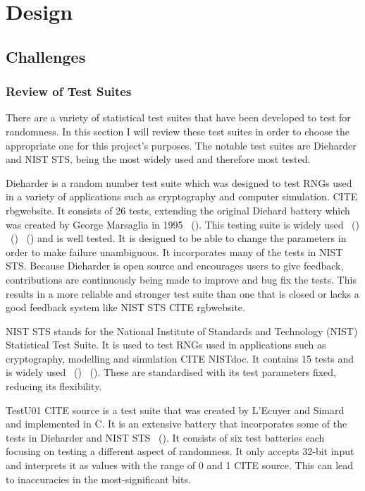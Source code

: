 \chapter{Design}

\section{Challenges}
\subsection{Review of Test Suites}
There are a variety of statistical test suites that have been developed to test for randomness. In this section I will review these test suites in order to choose the appropriate one for this project's purposes. The notable test suites are Dieharder and NIST STS, being the most widely used and therefore most tested. \newline

Dieharder is a random number test suite which was designed to test RNGs used in a variety of applications such as cryptography and computer simulation. CITE rbgwebsite. It consists of 26 tests, extending the original Diehard battery which was created by George Marsaglia in 1995 ~(\cite{10.1145/3447773}). This testing suite is widely used ~(\cite{10.1145/3527157}) ~(\cite{10.1145/3398726}) ~(\cite{10.1145/3624991}) and is well tested. It is designed to be able to change the parameters in order to make failure unambiguous. It incorporates many of the tests in NIST STS. Because Dieharder is open source and encourages users to give feedback, contributions are continuously being made to improve and bug fix the tests. This results in a more reliable and stronger test suite than one that is closed or lacks a good feedback system like NIST STS CITE rgbwebsite. \newline 

NIST STS stands for the National Institute of Standards and Technology (NIST) Statistical Test Suite. It is used to test RNGs  used in applications such as cryptography, modelling and simulation CITE NISTdoc. It contains 15 tests and is widely used ~(\cite{6236554}) ~(\cite{9209663}). These are standardised with its test parameters fixed, reducing its flexibility. \newline

TestU01 CITE source is a test suite that was created by L’Ecuyer and Simard and implemented in C. It is an extensive battery that incorporates some of the tests in Dieharder and NIST STS ~(\cite{10.1145/3447773}). It consists of six test batteries each focusing on testing a different aspect of randomness. It only accepts 32-bit input and interprets it as values with the range of 0 and 1 CITE source. This can lead to inaccuracies in the most-significant bits. \newline

